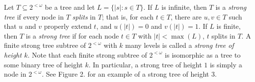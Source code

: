 \documentclass{amsart}
\theoremstyle{remark}
\theoremstyle{definition}
\theoremstyle{remark}
\newcommand{\om}{\omega}
\newcommand{\sse}{\subseteq}
\begin{document}
Let
 $T\sse 2^{<\om}$ be a tree and  let
$L=\{|s|:s\in T\}$.
If $L$ is infinite, then
$T$
is a
{\em strong tree} if every node in $T$ {\em splits} in $T$; that is, for each $t\in T$, there are $u,v\in T$ such that  $u$ and $v$ properly extend $t$,
and $u(|t|)=0$ and $v(|t|)=1$.
If $L$ is finite,
then $T$ is a {\em strong tree}
if for each node $t\in T$ with $|t|<\max(L)$,
$t$ splits in $T$.
A finite strong tree subtree of $2^{<\om}$ with $k$ many levels is called
a {\em strong tree of height $k$}.
Note that each finite strong subtree of $2^{<\om}$
is isomorphic as a tree to some binary tree of height $k$.
In particular, a strong tree  of height $1$ is simply a node in $2^{<\om}$.
See Figure 2. for an example of a strong tree of height $3$.




\end{document}
